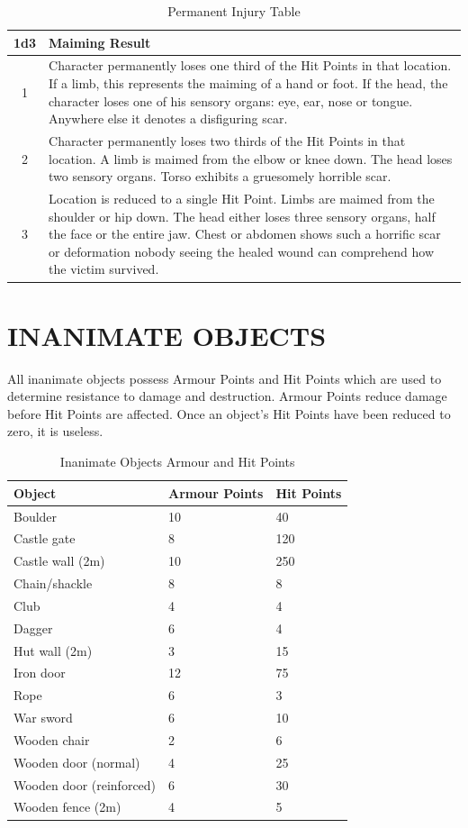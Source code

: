 \documentclass[10pt]{article}
\begin{document}
\begin{table}[h]
\centering
\caption{Permanent Injury Table}
\label{tab:permanent-injury}
\begin{tabular}{cp{10cm}}
\toprule
\textbf{1d3} & \textbf{Maiming Result} \\
\midrule
1 & Character permanently loses one third of the Hit Points in that location. If a limb, this represents the maiming of a hand or foot. If the head, the character loses one of his sensory organs: eye, ear, nose or tongue. Anywhere else it denotes a disfiguring scar. \\
\midrule
2 & Character permanently loses two thirds of the Hit Points in that location. A limb is maimed from the elbow or knee down. The head loses two sensory organs. Torso exhibits a gruesomely horrible scar. \\
\midrule
3 & Location is reduced to a single Hit Point. Limbs are maimed from the shoulder or hip down. The head either loses three sensory organs, half the face or the entire jaw. Chest or abdomen shows such a horrific scar or deformation nobody seeing the healed wound can comprehend how the victim survived. \\
\bottomrule
\end{tabular}
\end{table}

\section{INANIMATE OBJECTS}
\label{sec:objects}
All inanimate objects possess Armour Points and Hit Points which are used to determine resistance to damage and destruction. Armour Points reduce damage before Hit Points are affected. Once an object's Hit Points have been reduced to zero, it is useless.

\begin{table}[h]
\centering
\caption{Inanimate Objects Armour and Hit Points}
\label{tab:objects}
\begin{tabular}{lll}
\toprule
\textbf{Object} & \textbf{Armour Points} & \textbf{Hit Points} \\
\midrule
Boulder & 10 & 40 \\
Castle gate & 8 & 120 \\
Castle wall (2m) & 10 & 250 \\
Chain/shackle & 8 & 8 \\
Club & 4 & 4 \\
Dagger & 6 & 4 \\
Hut wall (2m) & 3 & 15 \\
Iron door & 12 & 75 \\
Rope & 6 & 3 \\
War sword & 6 & 10 \\
Wooden chair & 2 & 6 \\
Wooden door (normal) & 4 & 25 \\
Wooden door (reinforced) & 6 & 30 \\
Wooden fence (2m) & 4 & 5 \\
\bottomrule
\end{tabular}
\end{table}
\end{document}
